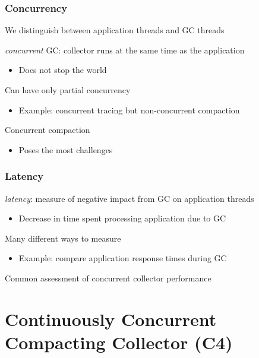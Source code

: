 \documentclass{beamer}
\newcommand{\linespace}{\vskip 0.25cm}
\begin{document}
\begin{frame}

\frametitle{Concurrency}

We distinguish between application threads and GC threads

\linespace
\linespace

\emph{concurrent} GC: collector runs at the same time as the application
\begin{itemize}
\item Does not stop the world
\end{itemize}

\linespace
\linespace

Can have only partial concurrency
\begin{itemize}
\item Example: concurrent tracing but non-concurrent compaction
\end{itemize}

\linespace
\linespace

Concurrent compaction
\begin{itemize}
\item Poses the most challenges
\end{itemize}

\end{frame}

\begin{frame}

\frametitle{Latency}

\emph{latency}: measure of negative impact from GC on application threads
\begin{itemize}
\item Decrease in time spent processing application due to GC
\end{itemize}

\linespace
\linespace

Many different ways to measure
\begin{itemize}
\item Example: compare application response times during GC %
\end{itemize}

\linespace
\linespace

Common assessment of concurrent collector performance

\end{frame}



\section[C4]{Continuously Concurrent Compacting Collector (C4)}
\end{document}
